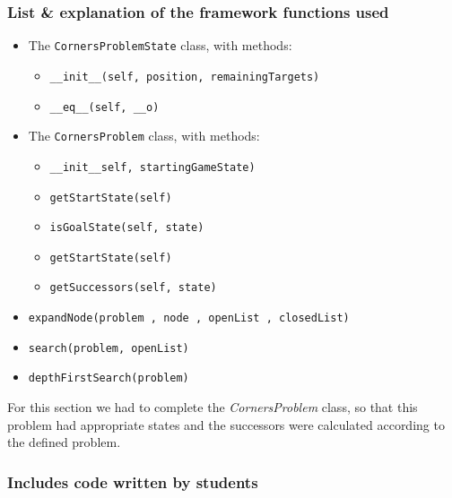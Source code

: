 \documentclass{article}
\begin{document}
\subsubsection{List \& explanation of the framework functions used}

\begin{itemize}
    \item The \texttt{CornersProblemState} class, with methods:
    \begin{itemize}
        \item \texttt{\_\_init\_\_(self, position, remainingTargets)}
        \item \texttt{\_\_eq\_\_(self, \_\_o)}
    \end{itemize}
    \item The \texttt{CornersProblem} class, with methods:
    \begin{itemize}
        \item \texttt{\_\_init\_\_self, startingGameState)}
        \item \texttt{getStartState(self)}
        \item \texttt{isGoalState(self, state)}
        \item \texttt{getStartState(self)}
        \item \texttt{getSuccessors(self, state)}
    \end{itemize}
    \item \texttt{expandNode(problem , node , openList , closedList)}
    \item \texttt{search(problem, openList)}
    \item \texttt{depthFirstSearch(problem)}
\end{itemize}

For this section we had to complete the \emph{CornersProblem} class, so that this problem had appropriate states and the successors were calculated according to the defined problem.

\subsubsection{Includes code written by students}
\end{document}
